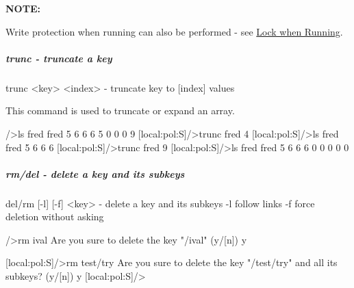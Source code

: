 {\bfseries NOTE:} \par
 \par
Write protection when running can also be performed -\/ see \hyperlink{RC_customize_ODB_RC_Lock_when_Running}{Lock when Running}.



\hypertarget{RC_odbedit_examples_RC_odbedit_trunc}{}\subparagraph{trunc  -\/ truncate a key}\label{RC_odbedit_examples_RC_odbedit_trunc}

\begin{DoxyCode}
trunc <key> <index>     - truncate key to [index] values
\end{DoxyCode}


This command is used to truncate or expand an array. 
\begin{DoxyCode}
/>ls fred 
fred
                                5
                                6
                                6
                                6
                                5
                                0
                                0
                                0
                                9
[local:pol:S]/>trunc fred 4
[local:pol:S]/>ls fred
fred
                                5
                                6
                                6
                                6
[local:pol:S]/>trunc fred 9
[local:pol:S]/>ls fred
fred
                                5
                                6
                                6
                                6
                                0
                                0
                                0
                                0
                                0
\end{DoxyCode}


\par
 

\hypertarget{RC_odbedit_examples_RC_odbedit_rm}{}\subparagraph{rm/del -\/ delete a key and its subkeys}\label{RC_odbedit_examples_RC_odbedit_rm}

\begin{DoxyCode}
del/rm [-l] [-f] <key>  - delete a key and its subkeys
  -l                      follow links
  -f                      force deletion without asking
\end{DoxyCode}
 \par



\begin{DoxyCode}
/>rm ival
Are you sure to delete the key
"/ival"
(y/[n]) y
 
[local:pol:S]/>rm test/try
Are you sure to delete the key "/test/try"
and all its subkeys? (y/[n]) y
[local:pol:S]/> 
\end{DoxyCode}


